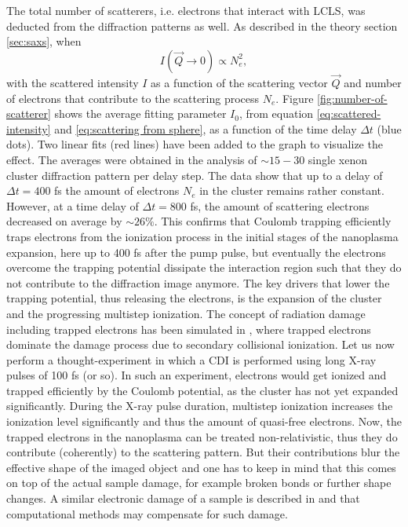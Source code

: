 The total number of scatterers, i.e. electrons that interact with LCLS, was deducted from the diffraction patterns as well. As described in the theory section \ref{sec:saxs}, when
\begin{equation}
I\left(\vec{Q}\rightarrow 0\right)\propto N_{e}^{2},
\label{eq:}
\end{equation}
with the scattered intensity $I$ as a function of the scattering vector $\vec{Q}$ and number of electrons that contribute to the scattering process $N_{e}$. Figure \ref{fig:number-of-scatterer} shows the average fitting parameter $I_{0}$, from equation \eqref{eq:scattered-intensity} and \eqref{eq:scattering from sphere}, as a function of the time delay $\Delta t$ (blue dots). Two linear fits (red lines) have been added to the graph to visualize the effect. The averages were obtained in the analysis of $\sim 15-30$ single xenon cluster diffraction pattern per delay step. The data show that up to a delay of $\Delta t=400$ fs the amount of electrons $N_{e}$ in the cluster remains rather constant. However, at a time delay of $\Delta t=800$ fs, the amount of scattering electrons decreased on average by $\sim 26 \%$. This confirms that Coulomb trapping efficiently traps electrons from the ionization process in the initial stages of the nanoplasma expansion, here up to 400 fs after the pump pulse, but eventually the electrons overcome the trapping potential dissipate the interaction region such that they do not contribute to the diffraction image anymore. The key drivers that lower the trapping potential, thus releasing the electrons, is the expansion of the cluster and the progressing multistep ionization. The concept of radiation damage including trapped electrons has been simulated in \citep{Hau-Riege-2004-PRE}, where trapped electrons dominate the damage process due to secondary collisional ionization. Let us now perform a thought-experiment in which a CDI is performed using long X-ray pulses of 100 fs (or so). In such an experiment, electrons would get ionized and trapped efficiently by the Coulomb potential, as the cluster has not yet expanded significantly. During the X-ray pulse duration, multistep ionization increases the ionization level significantly and thus the amount of quasi-free electrons. Now, the trapped electrons in the nanoplasma can be treated non-relativistic, thus they do contribute (coherently) to the scattering pattern. But their contributions blur the effective shape of the imaged object and one has to keep in mind that this comes on top of the actual sample damage, for example broken bonds or further shape changes. A similar electronic damage of a sample is described in \citep{Quiney-2010-NatPhys} and that computational methods may compensate for such damage.\\
